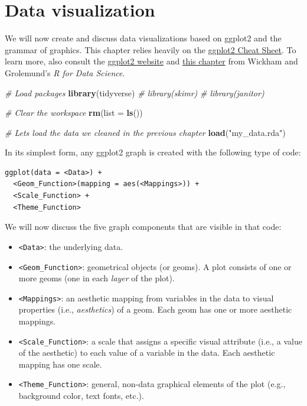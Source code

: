 \documentclass[
]{book}
\newenvironment{Shaded}{\begin{snugshade}}{\end{snugshade}}
\newcommand{\AttributeTok}[1]{\textcolor[rgb]{0.13,0.29,0.53}{#1}}
\newcommand{\CommentTok}[1]{\textcolor[rgb]{0.56,0.35,0.01}{\textit{#1}}}
\newcommand{\FunctionTok}[1]{\textcolor[rgb]{0.13,0.29,0.53}{\textbf{#1}}}
\newcommand{\NormalTok}[1]{#1}
\newcommand{\StringTok}[1]{\textcolor[rgb]{0.31,0.60,0.02}{#1}}
\providecommand{\tightlist}{%
  \setlength{\itemsep}{0pt}\setlength{\parskip}{0pt}}
\begin{document}
\hypertarget{visualization}{%
\chapter{Data visualization}\label{visualization}}

We will now create and discuss data visualizations based on ggplot2 and the grammar of graphics. This chapter relies heavily on the \href{https://rstudio.github.io/cheatsheets/html/data-visualization.html?_gl=1*10368jz*_ga*MjQ1OTc2NzA0LjE3MTIxMzM1NTU.*_ga_2C0WZ1JHG0*MTcxMzUyMzU4My40LjEuMTcxMzUyMzYxNS4wLjAuMA..}{ggplot2 Cheat Sheet}. To learn more, also consult the \href{https://ggplot2.tidyverse.org/}{ggplot2 website} and \href{https://r4ds.had.co.nz/data-visualisation.html}{this chapter} from Wickham and Grolemund's \emph{R for Data Science}.

\begin{Shaded}
\begin{Highlighting}[]
\CommentTok{\# Load packages}
\FunctionTok{library}\NormalTok{(tidyverse)}
\CommentTok{\# library(skimr)}
\CommentTok{\# library(janitor)}

\CommentTok{\# Clear the workspace}
\FunctionTok{rm}\NormalTok{(}\AttributeTok{list =} \FunctionTok{ls}\NormalTok{())}

\CommentTok{\# Let\textquotesingle{}s load the data we cleaned in the previous chapter}
\FunctionTok{load}\NormalTok{(}\StringTok{"my\_data.rda"}\NormalTok{)}
\end{Highlighting}
\end{Shaded}

In its simplest form, any ggplot2 graph is created with the following type of code:

\begin{verbatim}
ggplot(data = <Data>) +
  <Geom_Function>(mapping = aes(<Mappings>)) +
  <Scale_Function> +
  <Theme_Function>
\end{verbatim}

We will now discuss the five graph components that are visible in that code:

\begin{itemize}
\tightlist
\item
  \texttt{\textless{}Data\textgreater{}}: the underlying data.
\item
  \texttt{\textless{}Geom\_Function\textgreater{}}: geometrical objects (or geoms). A plot consists of one or more geoms (one in each \emph{layer} of the plot).
\item
  \texttt{\textless{}Mappings\textgreater{}}: an aesthetic mapping from variables in the data to visual properties (i.e., \emph{aesthetics}) of a geom. Each geom has one or more aesthetic mappings.
\item
  \texttt{\textless{}Scale\_Function\textgreater{}}: a scale that assigns a specific visual attribute (i.e., a value of the aesthetic) to each value of a variable in the data. Each aesthetic mapping has one scale.
\item
  \texttt{\textless{}Theme\_Function\textgreater{}}: general, non-data graphical elements of the plot (e.g., background color, text fonts, etc.).
\end{itemize}
\end{document}
